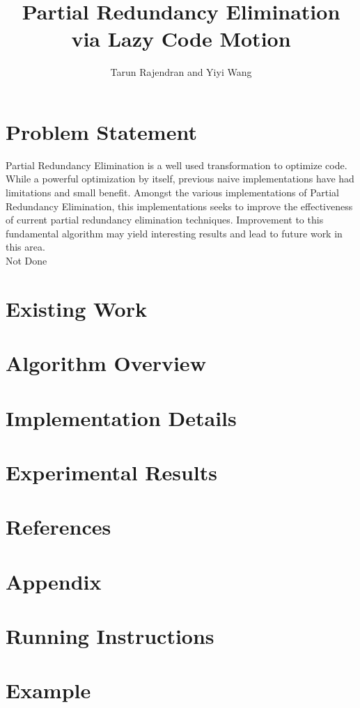 \documentclass[onecolumn,10pt]{journal}
\author{Tarun Rajendran and Yiyi Wang}
\title{Partial Redundancy Elimination via Lazy Code Motion}
\begin{document}
\maketitle

\section*{Problem Statement}

Partial Redundancy Elimination is a well used transformation to optimize code. While a powerful optimization by itself, previous naive implementations have had limitations and small benefit. Amongst the various implementations of Partial Redundancy Elimination, this implementations seeks to improve the effectiveness of current partial redundancy elimination techniques. Improvement to this fundamental algorithm may yield interesting results and lead to future work in this area. \\Not Done

\section*{Existing Work}

\section*{Algorithm Overview}

\section*{Implementation Details}

\section*{Experimental Results}

\section*{References}

\section*{Appendix}

\section*{Running Instructions}

\section*{Example}
\end{document}
